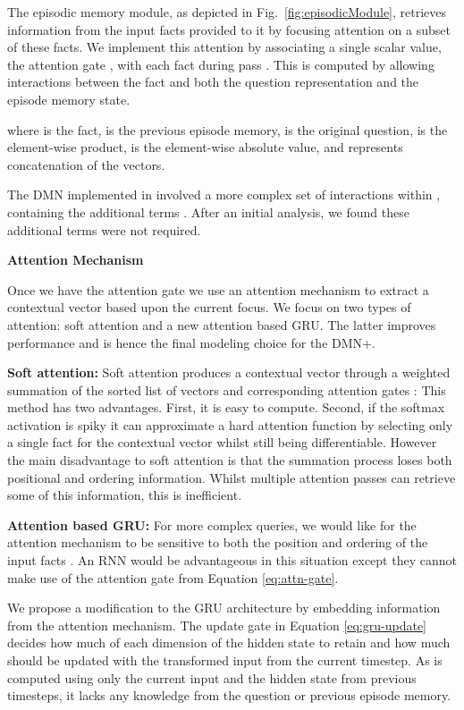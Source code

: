 \documentclass{article}
\begin{document}
The episodic memory module, as depicted in Fig.~\ref{fig:episodicModule}, retrieves information from the input facts  provided to it by focusing attention on a subset of these facts.
We implement this attention by associating a single scalar value, the attention gate , with each fact  during pass .
This is computed by allowing interactions between the fact and both the question representation and the episode memory state.
\setlength\arraycolsep{0.4pt}

where  is the  fact,  is the previous episode memory,  is the original question,  is the element-wise product,  is the element-wise absolute value, and  represents concatenation of the vectors.

The DMN implemented in \citet{Kumar2015} involved a more complex set of interactions within , containing the additional terms .
After an initial analysis, we found these additional terms were not required.

\textbf{Attention Mechanism}

Once we have the attention gate  we use an attention mechanism to extract a contextual vector  based upon the current focus.
We focus on two types of attention: soft attention and a new attention based GRU. The latter improves performance and is hence the final modeling choice for the DMN+.

\textbf{Soft attention:}
Soft attention produces a contextual vector  through a weighted summation of the sorted list of vectors  and corresponding attention gates : 
This method has two advantages.
First, it is easy to compute.
Second, if the softmax activation is spiky it can approximate a hard attention function by selecting only a single fact for the contextual vector whilst still being differentiable.
However the main disadvantage to soft attention is that the summation process loses both positional and ordering information.
Whilst multiple attention passes can retrieve some of this information, this is inefficient.

\textbf{Attention based GRU:} \label{sec:attngru}
For more complex queries, we would like for the attention mechanism to be sensitive to both the position and ordering of the input facts .
An RNN would be advantageous in this situation except they cannot make use of the attention gate from Equation \ref{eq:attn-gate}.

We propose a modification to the GRU architecture by embedding information from the attention mechanism.
The update gate  in Equation \ref{eq:gru-update} decides how much of each dimension of the hidden state to retain and how much should be updated with the transformed input  from the current timestep.
As  is computed using only the current input and the hidden state from previous timesteps, it lacks any knowledge from the question or previous episode memory.
\end{document}
